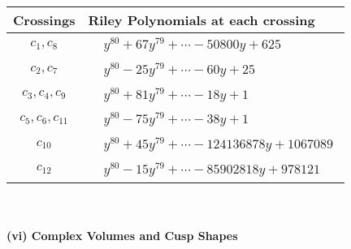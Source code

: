 \documentclass[1p]{elsarticle_modified}
\theoremstyle{definition}
\begin{document}
\begin{tabular}{m{50pt}|m{274pt}}
Crossings & \hspace{64pt}Riley Polynomials at each crossing \\
\hline $$\begin{aligned}c_{1},c_{8}\end{aligned}$$&$\begin{aligned}
&y^{80}+67 y^{79}+\cdots-50800 y+625
\end{aligned}$\\
\hline $$\begin{aligned}c_{2},c_{7}\end{aligned}$$&$\begin{aligned}
&y^{80}-25 y^{79}+\cdots-60 y+25
\end{aligned}$\\
\hline $$\begin{aligned}c_{3},c_{4},c_{9}\end{aligned}$$&$\begin{aligned}
&y^{80}+81 y^{79}+\cdots-18 y+1
\end{aligned}$\\
\hline $$\begin{aligned}c_{5},c_{6},c_{11}\end{aligned}$$&$\begin{aligned}
&y^{80}-75 y^{79}+\cdots-38 y+1
\end{aligned}$\\
\hline $$\begin{aligned}c_{10}\end{aligned}$$&$\begin{aligned}
&y^{80}+45 y^{79}+\cdots-124136878 y+1067089
\end{aligned}$\\
\hline $$\begin{aligned}c_{12}\end{aligned}$$&$\begin{aligned}
&y^{80}-15 y^{79}+\cdots-85902818 y+978121
\end{aligned}$\\
\hline
\end{tabular}\\~\\
\newpage\flushleft \textbf{(vi) Complex Volumes and Cusp Shapes}
\end{document}
